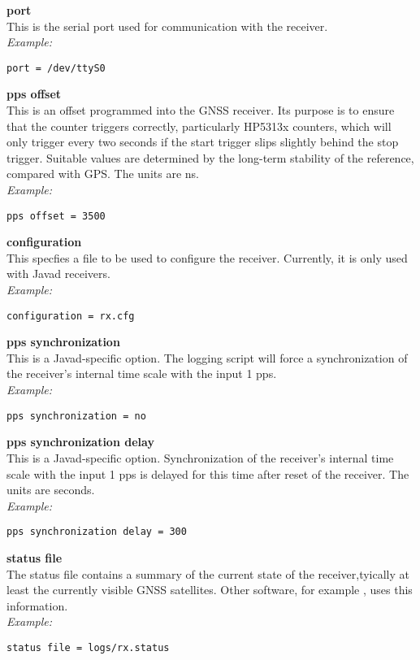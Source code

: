 {\bfseries port}\\
This is the serial port used for communication with the receiver.\\
\textit{Example:}
\begin{lstlisting}
port = /dev/ttyS0
\end{lstlisting}

{\bfseries pps offset}\\ 
This is an offset programmed into the GNSS receiver. Its purpose is to ensure that the counter
triggers correctly, particularly HP5313x counters, which will only trigger every two seconds if the 
start trigger slips slightly behind the stop trigger. Suitable values are determined by the long-term stability of the
reference, compared with GPS.
The units are ns.\\
\textit{Example:}
\begin{lstlisting}
pps offset = 3500
\end{lstlisting}

{\bfseries configuration}\\ \hypertarget{h:configuration}{}
This specfies a file to be used to configure the receiver. Currently, it is only used
with Javad receivers.\\
\textit{Example:}
\begin{lstlisting}
configuration = rx.cfg
\end{lstlisting}

{\bfseries pps synchronization}\\ \hypertarget{h:pps_synchronization}{}
This is a Javad-specific option. The logging script will force a synchronization of the receiver's
internal time scale with the input 1 pps.\\
\textit{Example:}
\begin{lstlisting}
pps synchronization = no
\end{lstlisting}

{\bfseries pps synchronization delay}\\ \hypertarget{h:pps_synchronization_delay}{}
This is a Javad-specific option. Synchronization of the receiver's
internal time scale with the input 1 pps is delayed for this time after reset of the receiver.
The units are seconds.\\
\textit{Example:}
\begin{lstlisting}
pps synchronization delay = 300
\end{lstlisting}

{\bfseries status file}\\
The status file contains a summary of the current state of the receiver,tyically at least the
currently visible GNSS satellites. Other software, for example , uses this information.\\
\textit{Example:}
\begin{lstlisting}
status file = logs/rx.status
\end{lstlisting}

